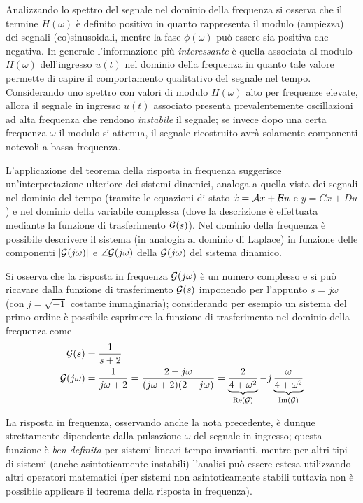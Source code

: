 		Analizzando lo spettro del segnale nel dominio della frequenza si osserva che il termine $H(\omega)$ è definito positivo in quanto rappresenta il modulo (ampiezza) dei segnali (co)sinusoidali, mentre la fase $\phi(\omega)$ può essere sia positiva che negativa. In generale l'informazione più \textit{interessante} è quella associata al modulo $H(\omega)$ dell'ingresso $u(t)$ nel dominio della frequenza in quanto tale valore permette di capire il comportamento qualitativo del segnale nel tempo. \\
		Considerando uno spettro con valori di modulo $H(\omega)$ alto per frequenze elevate, allora il segnale in ingresso $u(t)$ associato presenta prevalentemente oscillazioni ad alta frequenza che rendono \textit{instabile} il segnale; se invece dopo una certa frequenza $\omega$ il modulo si attenua, il segnale ricostruito avrà solamente componenti notevoli a bassa frequenza.
		
		\vspace{3mm} L'applicazione del teorema della risposta in frequenza suggerisce un'interpretazione ulteriore dei sistemi dinamici, analoga a quella vista dei segnali nel dominio del tempo (tramite le equazioni di stato $\dot x = \mathcal A x + \mathcal B u$ e $y = Cx + Du$) e nel dominio della variabile complessa (dove la descrizione è effettuata mediante la funzione di trasferimento $\mathcal G(s)$). Nel dominio della frequenza è possibile descrivere il sistema (in analogia al dominio di Laplace) in funzione delle componenti $|\mathcal G(j\omega)|$ e $\angle \mathcal G(j\omega)$ della  $\mathcal G(j\omega)$ del sistema dinamico.
		
		\begin{nota}
			Si osserva che la risposta in frequenza $\mathcal G(j\omega)$ è un numero complesso e si può ricavare dalla funzione di trasferimento $\mathcal G(s)$ imponendo per l'appunto $s=j\omega$ (con $j=\sqrt{-1}$ costante immaginaria); considerando per esempio un sistema del primo ordine è possibile esprimere la funzione di trasferimento nel dominio della frequenza come
			\begin{align*}
				\mathcal G(s) & = \frac 1 {s+2} \\
				\mathcal G(j\omega) & = \frac 1 {j\omega + 2} = \frac{ 2 - j\omega}{(j\omega + 2) ( 2 - j\omega)} = \underbrace{\frac 2 {4+\omega^2}}_{\textrm{Re}(\mathcal G)} - j \underbrace{\frac \omega {4+\omega^2}}_{\textrm{Im}(\mathcal G)}
			\end{align*}
		\end{nota}
		
		La risposta in frequenza, osservando anche la nota precedente, è dunque strettamente dipendente dalla pulsazione $\omega$ del segnale in ingresso; questa funzione è \textit{ben definita} per sistemi lineari tempo invarianti, mentre per altri tipi di sistemi (anche asintoticamente instabili) l'analisi può essere estesa utilizzando altri operatori matematici (per sistemi non asintoticamente stabili tuttavia non è possibile applicare il teorema della risposta in frequenza).
		
